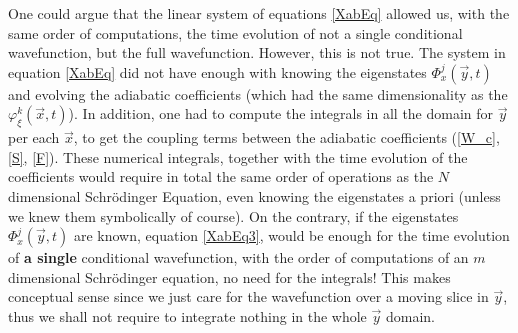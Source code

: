 \documentclass[11pt, a4paper]{article} %
\begin{document}
One could argue that the linear system of equations \eqref{XabEq} allowed us, with the same order of computations, the time evolution of not a single conditional wavefunction, but the full wavefunction. However, this is not true. The system in equation \eqref{XabEq} did not have enough with knowing the eigenstates $\Phi^j_x(\vec{y},t)$ and evolving the adiabatic coefficients (which had the same dimensionality as the $\varphi^k_\xi(\vec{x},t)$). In addition, one had to compute the integrals in all the domain for $\vec{y}$ per each $\vec{x}$, to get the coupling terms between the adiabatic coefficients (\eqref{W_c}, \eqref{S}, \eqref{F}). These numerical integrals, together with the time evolution of the coefficients would require in total the same order of operations as the $N$ dimensional Schrödinger Equation, even knowing the eigenstates a priori (unless we knew them symbolically of course). On the contrary, if the eigenstates $\Phi^j_x(\vec{y},t)$ are known, equation \eqref{XabEq3}, would be enough for the time evolution of {\bf a single} conditional wavefunction, with the order of computations of an $m$ dimensional Schrödinger equation, no need for the integrals! This makes conceptual sense since we just care for the wavefunction over a moving slice in $\vec{y}$, thus we shall not require to integrate nothing in the whole $\vec{y}$ domain. 
\end{document}
